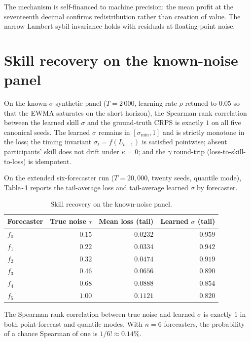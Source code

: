 \documentclass[
  11pt,
  a4paper,
  oneside]{report}
\begin{document}
The mechanism is self-financed to machine precision: the mean profit at
the seventeenth decimal confirms redistribution rather than creation of
value. The narrow Lambert sybil invariance holds with residuals at
floating-point noise.

\section{Skill recovery on the known-noise
panel}\label{skill-recovery-on-the-known-noise-panel}

On the known-\(\sigma\) synthetic panel (\(T = 2\,000\), learning rate
\(\rho\) retuned to \(0.05\) so that the EWMA saturates on the short
horizon), the Spearman rank correlation between the learned skill
\(\sigma\) and the ground-truth CRPS is exactly \(1\) on all five
canonical seeds. The learned \(\sigma\) remains in
\([\sigma_{\min}, 1]\) and is strictly monotone in the loss; the timing
invariant \(\sigma_t = f(L_{t-1})\) is satisfied pointwise; absent
participants' skill does not drift under \(\kappa = 0\); and the
\(\gamma\) round-trip (loss-to-skill-to-loss) is idempotent.

On the extended six-forecaster run (\(T = 20{,}000\), twenty seeds,
quantile mode), Table\textasciitilde{}\ref{tab:skill-recovery} reports
the tail-average loss and tail-average learned \(\sigma\) by forecaster.

\begin{table}[h]
\centering
\small
\begin{tabular}{lrrr}
\toprule
Forecaster & True noise $\tau$ & Mean loss (tail) & Learned $\sigma$ (tail) \\
\midrule
$f_0$ & $0.15$ & $0.0232$ & $0.959$ \\
$f_1$ & $0.22$ & $0.0334$ & $0.942$ \\
$f_2$ & $0.32$ & $0.0474$ & $0.919$ \\
$f_3$ & $0.46$ & $0.0656$ & $0.890$ \\
$f_4$ & $0.68$ & $0.0888$ & $0.854$ \\
$f_5$ & $1.00$ & $0.1121$ & $0.820$ \\
\bottomrule
\end{tabular}
\caption{Skill recovery on the known-noise panel.}
\label{tab:skill-recovery}
\end{table}

The Spearman rank correlation between true noise and learned \(\sigma\)
is exactly \(1\) in both point-forecast and quantile modes. With
\(n = 6\) forecasters, the probability of a chance Spearman of one is
\(1/6! \approx 0.14\%\).
\end{document}
